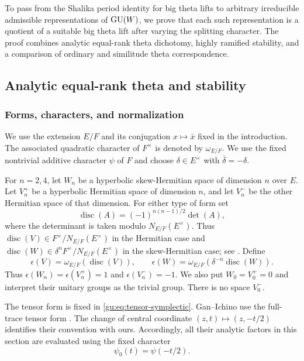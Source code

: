 \label{gu:cov:section}
To pass from the Shalika period identity for big theta lifts to
arbitrary irreducible admissible representations of $\operatorname{GU}(W)$,
we prove that each such representation is a quotient of a suitable
big theta lift after varying the splitting character. The proof
combines analytic equal-rank theta dichotomy, highly ramified
stability, and a comparison of ordinary and similitude theta
correspondence.

\subsection{Analytic equal-rank theta and stability}\label{ana:section}

\subsubsection{Forms, characters, and normalization}

We use the extension $E/F$ and its conjugation $x\mapsto\bar x$
fixed in the introduction. The associated quadratic character of
$F^\times$ is denoted by $\omega_{E/F}$. We use the fixed nontrivial
additive character $\psi$ of $F$ and choose $\delta\in E^\times$ with
$\bar\delta=-\delta$.

For $n=2,4$, let $W_n$ be a hyperbolic skew-Hermitian space of dimension
$n$ over $E$. Let $V_n^+$ be a hyperbolic Hermitian space of dimension
$n$, and let $V_n^-$ be the other Hermitian space of that dimension.
For either type of form set
\[
 \operatorname{disc}(A)=(-1)^{n(n-1)/2}\det(A),
\]
where the determinant is taken modulo $N_{E/F}(E^\times)$. Thus
$\operatorname{disc}(V)\in F^\times/N_{E/F}(E^\times)$ in the
Hermitian case and
$\operatorname{disc}(W)\in\delta^n F^\times/N_{E/F}(E^\times)$
in the skew-Hermitian case; see \cite[\S2.1]{GanIchino}. Define
\[
 \epsilon(V)=\omega_{E/F}(\operatorname{disc}(V)),\qquad
 \epsilon(W)=\omega_{E/F}(\delta^{-n}\operatorname{disc}(W)).
\]
Thus $\epsilon(W_n)=\epsilon(V_n^+)=1$ and
$\epsilon(V_n^-)=-1$. We also put $W_0=V_0^+=0$ and interpret their
unitary groups as the trivial group. There is no space $V_0^-$.

The tensor form is fixed in \eqref{gu:eq:tensor-symplectic}.
Gan--Ichino use the full-trace tensor form
\cite[\S4.1]{GanIchino}. The change of central
coordinate $(z,t)\mapsto(z,-t/2)$ identifies their convention with ours.
Accordingly, all their analytic factors in this section are evaluated
using the fixed character
\begin{equation}\label{ana:psi}
 \psi_0(t)=\psi(-t/2).
\end{equation}

